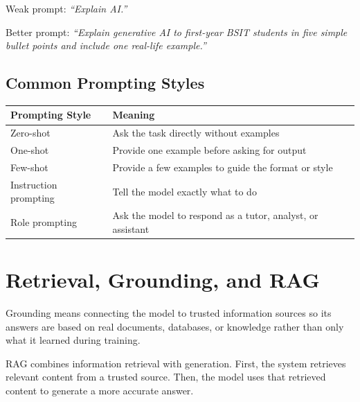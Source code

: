 \documentclass[11pt,a4paper]{article}
\begin{document}
\begin{examplebox}
Weak prompt: \textit{``Explain AI.''}

Better prompt: \textit{``Explain generative AI to first-year BSIT students in five simple bullet points and include one real-life example.''}
\end{examplebox}

\subsection{Common Prompting Styles}

\begin{longtable}{@{}p{3.2cm}p{10.3cm}@{}}
\toprule
\rowcolor{primary!15}
\textbf{Prompting Style} & \textbf{Meaning} \\
\midrule
\endhead
Zero-shot & Ask the task directly without examples \\
\addlinespace
One-shot & Provide one example before asking for output \\
\addlinespace
Few-shot & Provide a few examples to guide the format or style \\
\addlinespace
Instruction prompting & Tell the model exactly what to do \\
\addlinespace
Role prompting & Ask the model to respond as a tutor, analyst, or assistant \\
\bottomrule
\end{longtable}

\section{Retrieval, Grounding, and RAG}

\begin{definitionbox}[Grounding]
Grounding means connecting the model to trusted information sources so its answers are based on real documents, databases, or knowledge rather than only what it learned during training.
\end{definitionbox}

\begin{definitionbox}
RAG combines information retrieval with generation. First, the system retrieves relevant content from a trusted source. Then, the model uses that retrieved content to generate a more accurate answer.
\end{definitionbox}
\end{document}
